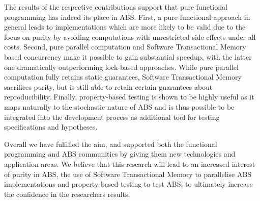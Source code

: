 The results of the respective contributions support that pure functional programming has indeed its place in ABS. First, a pure functional approach in general leads to implementations which are more likely to be valid due to the focus on purity by avoiding computations with unrestricted side effects under all costs. Second, pure parallel computation and Software Transactional Memory based concurrency make it possible to gain substantial speedup, with the latter one dramatically outperforming lock-based approaches. While pure parallel computation fully retains static guarantees, Software Transactional Memory sacrifices purity, but is still able to retain certain guarantees about reproducibility. Finally, property-based testing is shown to be highly useful as it maps naturally to the stochastic nature of ABS and is thus possible to be integrated into the development process as additional tool for testing specifications and hypotheses.

Overall we have fulfilled the aim, and supported both the functional programming and ABS communities by giving them new technologies and application areas. We believe that this research will lead to an increased interest of purity in ABS, the use of Software Transactional Memory to parallelise ABS implementations and property-based testing to test ABS, to ultimately increase the confidence in the researchers results.